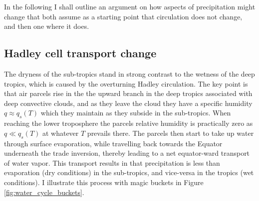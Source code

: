 \documentclass[12pt]{book}
\begin{document}
In the following I shall outline an argument on how aspects of precipitation might change that both assume as a starting point that circulation does not change, and then one where it does. 



\subsection{Hadley cell transport change}
The dryness of the sub-tropics stand in strong contrast to the wetness of the deep tropics, which is caused by the overturning Hadley circulation. The key point is that air parcels rise in the the upward branch in the deep tropics associated with deep convective clouds, and as they leave the cloud they have a specific humidity $q \approx q_s (T)$ which they maintain as they subside in the sub-tropics. When reaching the lower troposphere the parcels relative humidity is practically zero as $q \ll q_s(T)$ at whatever $T$ prevails there. The parcels then start to take up water through surface evaporation, while travelling back towards the Equator underneath the trade inversion, thereby leading to a net equator-ward transport of water vapor. This transport results in that precipitation is less than evaporation (dry conditions) in the sub-tropics, and vice-versa in the tropics (wet conditions).
I illustrate this process with magic buckets in Figure \ref{fig:water_cycle_buckets}. 
\end{document}
